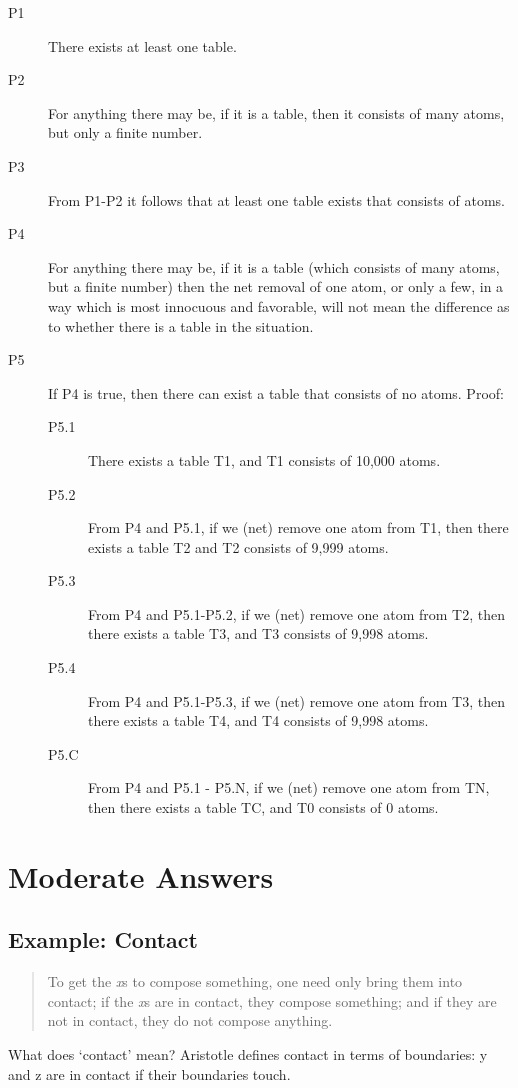 \documentclass[oneside]{article}
\begin{document}
\begin{description}
\item[P1] There exists at least one table.
\item[P2] For anything there may be, if it is a table, then it consists of many atoms, but only a finite number.
\item[P3] From P1-P2 it follows that at least one table exists that consists of atoms.
\item [P4] For anything there may be, if it is a table (which consists of many atoms, but a finite number) then the net removal of one atom, or only a few, in a way which is most innocuous and favorable, will not mean the difference as to whether there is a table in the situation. 
\item [P5] If P4 is true, then there can exist a table that consists of no atoms. Proof:
\begin{description}
\item[P5.1] There exists a table T{\scriptsize 1}, and T{\scriptsize 1} consists of 10,000 atoms.
\item[P5.2] From P4 and P5.1, if we (net) remove one atom from T{\scriptsize 1}, then there exists a table T{\scriptsize 2} and T{\scriptsize 2} consists of 9,999 atoms.
\item[P5.3] From P4 and P5.1-P5.2,  if we (net) remove one atom from T{\scriptsize 2}, then there exists a table T{\scriptsize 3}, and T{\scriptsize 3} consists of 9,998 atoms.
\item[P5.4] From P4 and P5.1-P5.3,  if we (net) remove one atom from T{\scriptsize 3}, then there exists a table T{\scriptsize 4}, and T{\scriptsize 4} consists of 9,998 atoms.
\item[P5.C] From P4 and P5.1 - P5.N, if we (net) remove one atom from T{\scriptsize N}, then there exists a table T{\scriptsize C}, and T{\scriptsize 0} consists of 0 atoms.
\end{description}
\end{description}

\section*{Moderate Answers}
\subsection*{Example: Contact}
\begin{quote}
To get the \emph{x}s to compose something, one need only bring them into contact; if the \emph{x}s are in contact, they compose something; and if they are not in contact, they do not compose anything.
\end{quote}
What does `contact' mean? Aristotle defines contact in terms of boundaries: y and z are in contact if their boundaries touch. 
\end{document}
